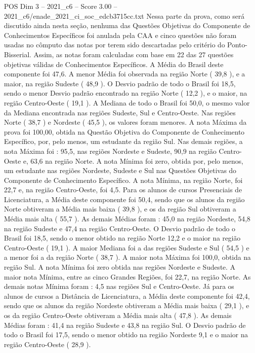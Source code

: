 \begin{textsample}{POS Dim 3 – 2021\_c6 – Score 3.00 – 2021\_c6/enade\_2021\_ci\_soc\_edcb3715cc.txt}
Nessa parte da prova, como será discutido ainda nesta seção, nenhuma das Questões Objetivas do Componente de Conhecimentos Específicos foi anulada pela CAA e cinco questões não foram usadas no cômputo das notas por terem sido descartadas pelo critério do Ponto-Bisserial.
Assim, as notas foram calculadas com base em 22 das 27 questões objetivas válidas de Conhecimentos Específicos.
A Média do Brasil deste componente foi 47,6.
A menor Média foi observada na região Norte ( 39,8 ), e a maior, na região Sudeste ( 48,9 ).
O Desvio padrão de todo o Brasil foi 18,5, sendo o menor Desvio padrão encontrado na região Norte ( 12,2 ), e o maior, na região Centro-Oeste ( 19,1 ).
A Mediana de todo o Brasil foi 50,0, o mesmo valor da Mediana encontrada nas regiões Sudeste, Sul e Centro-Oeste.
Nas regiões Norte ( 38,7 ) e Nordeste ( 45,5 ), os valores foram menores.
A nota Máxima da prova foi 100,00, obtida na Questão Objetiva do Componente de Conhecimento Específico, por, pelo menos, um estudante da região Sul.
Nas demais regiões, a nota Máxima foi : 95,5, nas regiões Nordeste e Sudeste, 90,9 na região Centro-Oeste e, 63,6 na região Norte.
A nota Mínima foi zero, obtida por, pelo menos, um estudante nas regiões Nordeste, Sudeste e Sul nas Questões Objetivas do Componente de Conhecimento Específico.
A nota Mínima, na região Norte, foi 22,7 e, na região Centro-Oeste, foi 4,5.
Para os alunos de cursos Presenciais de Licenciatura, a Média deste componente foi 50,4, sendo que os alunos da região Norte obtiveram a Média mais baixa ( 39,8 ), e os da região Sul obtiveram a Média mais alta ( 55,7 ).
As demais Médias foram : 45,0 na região Nordeste, 54,8 na região Sudeste e 47,4 na região Centro-Oeste.
O Desvio padrão de todo o Brasil foi 18,5, sendo o menor obtido na região Norte 12,2 e o maior na região Centro-Oeste ( 19,1 ).
A maior Mediana foi a das regiões Sudeste e Sul ( 54,5 ) e a menor foi a da região Norte ( 38,7 ).
A maior nota Máxima foi 100,0, obtida na região Sul.
A nota Mínima foi zero obtida nas regiões Nordeste e Sudeste.
A maior nota Mínima, entre as cinco Grandes Regiões, foi 22,7, na região Norte.
As demais notas Mínima foram : 4,5 nas regiões Sul e Centro-Oeste.
Já para os alunos de cursos a Distância de Licenciatura, a Média deste componente foi 42,4, sendo que os alunos da região Nordeste obtiveram a Média mais baixa ( 29,1 ), e os da região Centro-Oeste obtiveram a Média mais alta ( 47,8 ).
As demais Médias foram : 41,4 na região Sudeste e 43,8 na região Sul.
O Desvio padrão de todo o Brasil foi 17,5, sendo o menor obtido na região Nordeste 9,1 e o maior na região Centro-Oeste ( 28,9 ).

\end{textsample}
